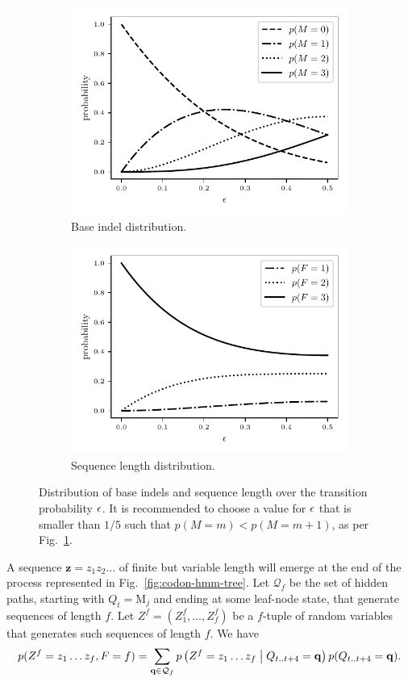 \begin{figure}[htbp]
\centering
\begin{subfigure}{.5\textwidth}
  \centering
  \includegraphics[width=.7\linewidth]{figure/indel-prob}
  \caption{Base indel distribution.}%
  \label{fig:indel-dist}
\end{subfigure}%
\begin{subfigure}{.5\textwidth}
  \centering
  \includegraphics[width=.7\linewidth]{figure/seq-len-prob}
  \caption{Sequence length distribution.}%
  \label{fig:len-dist}
\end{subfigure}
\caption{
    Distribution of base indels and sequence length over the transition probability $\epsilon$.
    It is recommended to choose a value for $\epsilon$ that is smaller than $1/5$ such that
    $p(M=m)<p(M=m+1)$, as per Fig.~\ref{fig:indel-dist}.
}\label{fig:dist}
\end{figure}

A sequence $\mathbf z=z_1 z_2\dots$ of finite but variable length will emerge at the end of the
process represented in Fig.~\ref{fig:codon-hmm-tree}.
Let $\mathcal Q_f$ be the set of hidden paths, starting with $Q_t=\mathrm M_j$ and ending at some leaf-node state,
that generate sequences of length $f$.
Let $Z^f=(Z^f_1, \dots, Z^f_f)$ be a $f$-tuple of random variables that generates such sequences of length $f$.
We have
\begin{equation*}
  p(Z^f=z_1\dots z_f,F=f) = \sum_{\mathbf q \in \mathcal Q_f}
  p\left(Z^f=z_1\dots z_f\;\middle|\; Q_{t..t+4}=\mathbf q\right) p(Q_{t..t+4}=\mathbf q).
\end{equation*}
